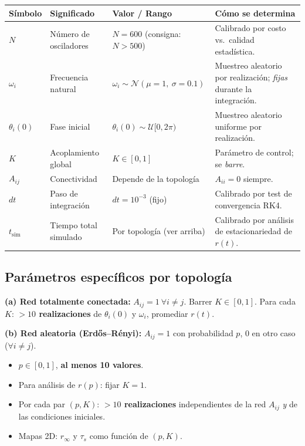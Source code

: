 \documentclass[11pt,a4paper]{article}
\begin{document}
\begin{center}
\renewcommand{\arraystretch}{1.25}
\begin{tabular}{@{}p{1.4cm} p{4.6cm} p{4.6cm} p{4.6cm}@{}}
\toprule
\textbf{Símbolo} & \textbf{Significado} & \textbf{Valor / Rango} & \textbf{Cómo se determina} \\
\midrule
$N$ & Número de osciladores & $N = 600$ (consigna: $N>500$) & Calibrado por costo vs.\ calidad estadística. \\
$\omega_i$ & Frecuencia natural & $\omega_i \sim \mathcal{N}(\mu{=}1,\ \sigma{=}0.1)$ & Muestreo aleatorio por realización; \emph{fijas} durante la integración. \\
$\theta_i(0)$ & Fase inicial & $\theta_i(0) \sim \mathcal{U}[0, 2\pi)$ & Muestreo aleatorio uniforme por realización. \\
$K$ & Acoplamiento global & $K \in [0, 1]$ & Parámetro de control; se \emph{barre}. \\
$A_{ij}$ & Conectividad & Depende de la topología & $A_{ii}=0$ siempre. \\
$dt$ & Paso de integración & $dt = 10^{-3}$ (fijo) & Calibrado por test de convergencia RK4. \\
$t_{\text{sim}}$ & Tiempo total simulado & Por topología (ver arriba) & Calibrado por análisis de estacionariedad de $r(t)$. \\
\bottomrule
\end{tabular}
\end{center}

\subsection*{Parámetros específicos por topología}

\textbf{(a) Red totalmente conectada:}
$A_{ij}=1\ \forall i\neq j$. Barrer $K\in[0,1]$. Para cada $K$: \textbf{$>10$ realizaciones} de $\theta_i(0)$ y $\omega_i$, promediar $r(t)$.

\medskip
\textbf{(b) Red aleatoria (Erdős--Rényi):}
$A_{ij}=1$ con probabilidad $p$, $0$ en otro caso ($\forall i\neq j$).
\begin{itemize}
  \item $p \in [0, 1]$, \textbf{al menos 10 valores}.
  \item Para análisis de $r(p)$: fijar $K=1$.
  \item Por cada par $(p, K)$: \textbf{$>10$ realizaciones} independientes de la red $A_{ij}$ \emph{y} de las condiciones iniciales.
  \item Mapas 2D: $r_\infty$ y $\tau_s$ como función de $(p, K)$.
\end{itemize}
\end{document}

